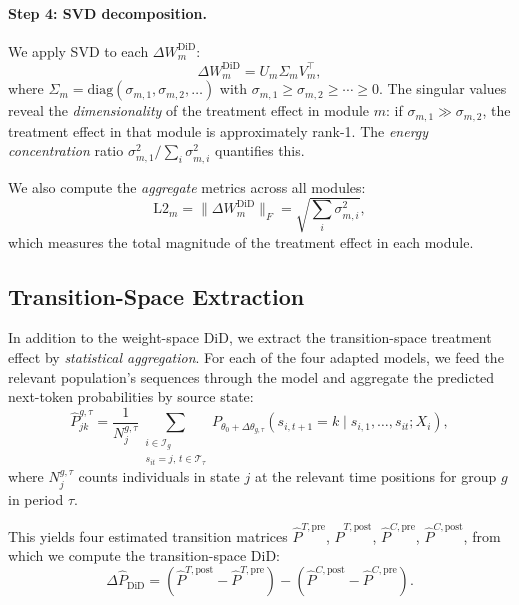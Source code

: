\documentclass[12pt]{article}
\begin{document}
\paragraph{Step 4: SVD decomposition.} We apply SVD to each $\Delta W_m^{\text{DiD}}$:
\begin{equation}\label{eq:svd}
\Delta W_m^{\text{DiD}} = U_m \Sigma_m V_m^\top,
\end{equation}
where $\Sigma_m = \text{diag}(\sigma_{m,1}, \sigma_{m,2}, \ldots)$ with $\sigma_{m,1} \geq \sigma_{m,2} \geq \cdots \geq 0$. The singular values reveal the \textit{dimensionality} of the treatment effect in module $m$: if $\sigma_{m,1} \gg \sigma_{m,2}$, the treatment effect in that module is approximately rank-1. The \textit{energy concentration} ratio $\sigma_{m,1}^2 / \sum_i \sigma_{m,i}^2$ quantifies this.

We also compute the \textit{aggregate} metrics across all modules:
\begin{equation}
\text{L2}_m = \|\Delta W_m^{\text{DiD}}\|_F = \sqrt{\sum_i \sigma_{m,i}^2},
\end{equation}
which measures the total magnitude of the treatment effect in each module.

\subsection{Transition-Space Extraction}\label{subsec:extraction}

In addition to the weight-space DiD, we extract the transition-space treatment effect by \textit{statistical aggregation}. For each of the four adapted models, we feed the relevant population's sequences through the model and aggregate the predicted next-token probabilities by source state:
\begin{equation}\label{eq:extraction}
\hat{P}^{g,\tau}_{jk} = \frac{1}{N_j^{g,\tau}} \sum_{\substack{i \in \mathcal{I}_g \\ s_{it} = j, \, t \in \mathcal{T}_\tau}} P_{\theta_0 + \Delta\theta_{g,\tau}}(s_{i,t+1} = k \mid s_{i,1}, \ldots, s_{it}; X_i),
\end{equation}
where $N_j^{g,\tau}$ counts individuals in state $j$ at the relevant time positions for group $g$ in period $\tau$.

This yields four estimated transition matrices $\hat{P}^{T,\text{pre}}$, $\hat{P}^{T,\text{post}}$, $\hat{P}^{C,\text{pre}}$, $\hat{P}^{C,\text{post}}$, from which we compute the transition-space DiD:
\begin{equation}
\Delta \hat{P}_{\text{DiD}} = (\hat{P}^{T,\text{post}} - \hat{P}^{T,\text{pre}}) - (\hat{P}^{C,\text{post}} - \hat{P}^{C,\text{pre}}).
\end{equation}
\end{document}
